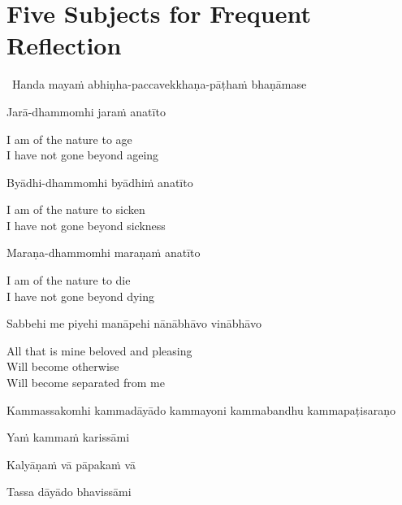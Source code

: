 \section{Five Subjects for Frequent Reflection}
\label{five-reflections}

\begin{leader}
  \anglebracketleft\ \hspace{-0.5mm}Handa mayaṁ abhiṇha-paccavekkhaṇa-pāṭhaṁ bhaṇāmase \hspace{-0.5mm}\anglebracketright\
\end{leader}

Jarā-dhammomhi jaraṁ anatīto

\begin{english}
  I am of the nature to age\\
  I have not gone beyond ageing
\end{english}

Byādhi-dhammomhi byādhiṁ anatīto

\begin{english}
  I am of the nature to sicken\\
  I have not gone beyond sickness
\end{english}

Maraṇa-dhammomhi maraṇaṁ anatīto

\begin{english}
  I am of the nature to die\\
  I have not gone beyond dying
\end{english}

Sabbehi me piyehi manāpehi nānābhāvo vinābhāvo

\begin{english}
  All that is mine beloved and pleasing\\
  Will become otherwise\\
  Will become separated from me
\end{english}

\begin{pali-hang}
  Kammassakomhi kammadāyādo kammayoni kammabandhu kammapaṭisaraṇo\\
\end{pali-hang}
\begin{pali-hangtogether}
  Yaṁ kammaṁ karissāmi\\
\end{pali-hangtogether}
\begin{pali-hangtogether}
  Kalyāṇaṁ vā pāpakaṁ vā\\
\end{pali-hangtogether}
\begin{pali-hangtogether}
  Tassa dāyādo bhavissāmi
\end{pali-hangtogether}

